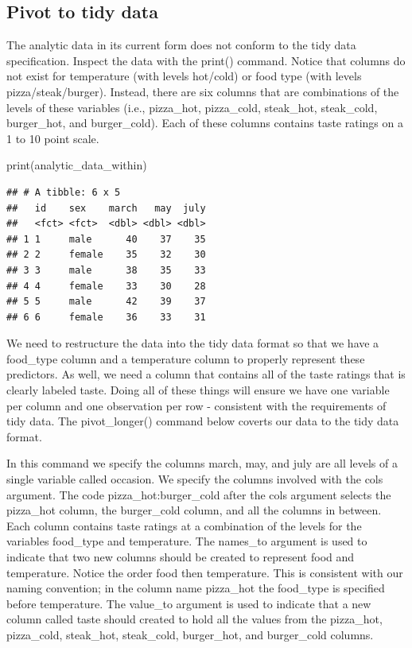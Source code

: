 \documentclass[
]{krantz}
\makeatletter
\newenvironment{Shaded}{\begin{snugshade}}{\end{snugshade}}
\newcommand{\FunctionTok}[1]{\textcolor[rgb]{0,0,0}{#1}}
\newcommand{\NormalTok}[1]{#1}
\newenvironment{kframe}{%
\medskip{}
\setlength{\fboxsep}{.8em}
 \def\at@end@of@kframe{}%
 \ifinner\ifhmode%
  \def\at@end@of@kframe{\end{minipage}}%
  \begin{minipage}{\columnwidth}%
 \fi\fi%
 \def\FrameCommand##1{\hskip\@totalleftmargin \hskip-\fboxsep
 \colorbox{shadecolor}{##1}\hskip-\fboxsep
     \hskip-\linewidth \hskip-\@totalleftmargin \hskip\columnwidth}%
 \MakeFramed {\advance\hsize-\width
   \@totalleftmargin\z@ \linewidth\hsize
   \@setminipage}}%
 {\par\unskip\endMakeFramed%
 \at@end@of@kframe}
\renewenvironment{Shaded}{\begin{kframe}}{\end{kframe}}
\makeatother
\begin{document}
\hypertarget{pivot-to-tidy-data-1}{%
\subsection{Pivot to tidy data}\label{pivot-to-tidy-data-1}}

The analytic data in its current form does not conform to the tidy data specification. Inspect the data with the print() command. Notice that columns do not exist for temperature (with levels hot/cold) or food type (with levels pizza/steak/burger). Instead, there are six columns that are combinations of the levels of these variables (i.e., pizza\_hot, pizza\_cold, steak\_hot, steak\_cold, burger\_hot, and burger\_cold). Each of these columns contains taste ratings on a 1 to 10 point scale.

\begin{Shaded}
\begin{Highlighting}[]
\FunctionTok{print}\NormalTok{(analytic\_data\_within)}
\end{Highlighting}
\end{Shaded}

\begin{verbatim}
## # A tibble: 6 x 5
##   id    sex    march   may  july
##   <fct> <fct>  <dbl> <dbl> <dbl>
## 1 1     male      40    37    35
## 2 2     female    35    32    30
## 3 3     male      38    35    33
## 4 4     female    33    30    28
## 5 5     male      42    39    37
## 6 6     female    36    33    31
\end{verbatim}

We need to restructure the data into the tidy data format so that we have a food\_type column and a temperature column to properly represent these predictors. As well, we need a column that contains all of the taste ratings that is clearly labeled taste. Doing all of these things will ensure we have one variable per column and one observation per row - consistent with the requirements of tidy data. The pivot\_longer() command below coverts our data to the tidy data format.

In this command we specify the columns march, may, and july are all levels of a single variable called occasion. We specify the columns involved with the cols argument. The code pizza\_hot:burger\_cold after the cols argument selects the pizza\_hot column, the burger\_cold column, and all the columns in between. Each column contains taste ratings at a combination of the levels for the variables food\_type and temperature. The names\_to argument is used to indicate that two new columns should be created to represent food and temperature. Notice the order food then temperature. This is consistent with our naming convention; in the column name pizza\_hot the food\_type is specified before temperature. The value\_to argument is used to indicate that a new column called taste should created to hold all the values from the pizza\_hot, pizza\_cold, steak\_hot, steak\_cold, burger\_hot, and burger\_cold columns.
\end{document}
